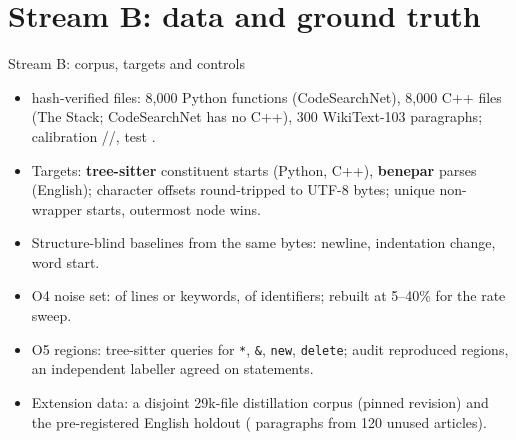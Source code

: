 \documentclass[aspectratio=169,11pt]{beamer}
\newcommand{\hl}[1]{\textcolor{acc}{\textbf{#1}}}
\begin{document}
\section{Stream B: data and ground truth}
\begin{frame}{Stream B: corpus, targets and controls}
\begin{itemize}\small
\item \nSamples{} hash-verified files: 8{,}000 Python functions (CodeSearchNet), 8{,}000 C++ files (The Stack; CodeSearchNet has no C++), 300 WikiText-103 paragraphs; calibration \nCalPy{}/\nCalCpp{}/\nCalEn{}, test \nTestAll{}.
\item Targets: \hl{tree-sitter} constituent starts (Python, C++), \hl{benepar} parses (English); character offsets round-tripped to UTF-8 bytes; unique non-wrapper starts, outermost node wins.
\item Structure-blind baselines from the same bytes: newline, indentation change, word start.
\item O4 noise set: \OFourRate{} of lines or keywords, \OFourCaseRate{} of identifiers; rebuilt at 5--40\% for the rate sweep.
\item O5 regions: tree-sitter queries for \texttt{*}, \texttt{\&}, \texttt{new}, \texttt{delete}; audit reproduced \xAuditRepro{} regions, an independent labeller agreed on \xAuditAgree{} statements.
\item Extension data: a disjoint 29k-file distillation corpus (pinned revision) and the pre-registered English holdout (\xHoldFiles{} paragraphs from 120 unused articles).
\end{itemize}
\end{frame}
\end{document}
